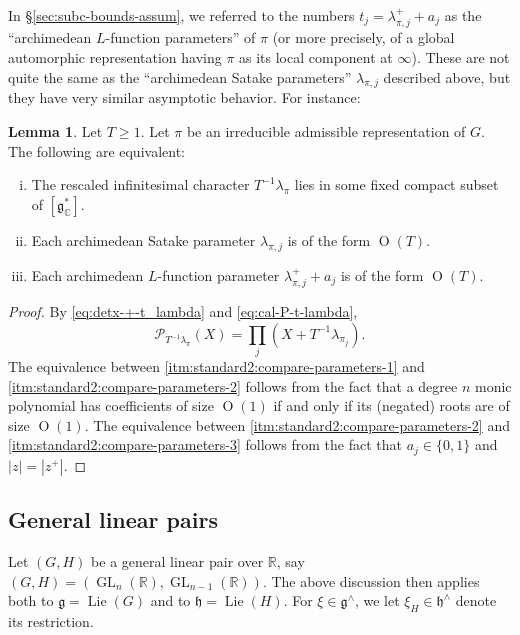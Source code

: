 \documentclass[reqno]{amsart}
\DeclareMathOperator{\GL}{GL}
\DeclareMathOperator{\Lie}{Lie}
\def\O{\operatorname{O}}
\theoremstyle{plain} \newtheorem{theorem} {Theorem}
\theoremstyle{definition} \newtheorem{definition} [theorem] {Definition}
\theoremstyle{itplain} %
\newtheorem{lemma}[theorem]{Lemma}
\numberwithin{equation}{section}
\numberwithin{theorem}{section}
\renewcommand{\geq}{\geqslant}
\begin{document}
In \S\ref{sec:subc-bounds-assum}, we referred to the numbers $t_j = \lambda_{\pi,j}^+ + a_j$ as the ``archimedean $L$-function parameters'' of $\pi$ (or more precisely, of a global automorphic representation having $\pi$ as its local component at $\infty$).  These are not quite the same as the ``archimedean Satake parameters'' $\lambda_{\pi,j}$ described above, but they have very similar asymptotic behavior.  For instance:
\begin{lemma}\label{lem:standard:let-t-geq}
  Let $T \geq 1$.  Let $\pi$ be an irreducible admissible representation of $G$.  The following are equivalent:
  \begin{enumerate}[(i)]
  \item \label{itm:standard2:compare-parameters-1} The rescaled infinitesimal character $T^{-1} \lambda_\pi$ lies in some fixed compact subset of $[\mathfrak{g}_{\mathbb{C}}^*]$.
  \item \label{itm:standard2:compare-parameters-2} Each archimedean Satake parameter  $\lambda_{\pi,j}$ is of the form $\O(T)$.
  \item  \label{itm:standard2:compare-parameters-3} Each archimedean $L$-function parameter $\lambda_{\pi,j}^+ + a_j$ is of the form $\O(T)$.
  \end{enumerate}
\end{lemma}
\begin{proof}
  By \eqref{eq:detx-+-t_lambda} and \eqref{eq:cal-P-t-lambda},
  \begin{equation*}
    \mathcal{P}_{T^{-1} \lambda_\pi}(X) = \prod_j (X + T^{-1} \lambda_{\pi_j}).
  \end{equation*}
  The equivalence between \eqref{itm:standard2:compare-parameters-1} and \eqref{itm:standard2:compare-parameters-2}
  follows from the fact that a degree $n$ monic polynomial has coefficients of size $\O(1)$ if and only if its (negated) roots are of size $\O(1)$.
  The equivalence between \eqref{itm:standard2:compare-parameters-2} and \eqref{itm:standard2:compare-parameters-3} follows from the fact that $a_j \in \{0,1\}$ and $|z| = |z^+|$.
\end{proof}

\subsection{General linear pairs}
Let $(G,H)$ be a general linear pair over $\mathbb{R}$, say $(G,H) = (\GL_n(\mathbb{R}), \GL_{n-1}(\mathbb{R}))$.  The above discussion then applies both to $\mathfrak{g} = \Lie(G)$ and to $\mathfrak{h} = \Lie(H)$.  For $\xi \in \mathfrak{g}^\wedge$, we let $\xi_H \in \mathfrak{h}^\wedge$ denote its restriction.
\end{document}
